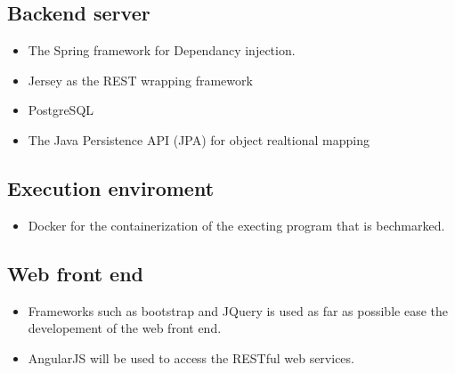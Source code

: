 \subsection{Backend server}
\begin{itemize}
\item The Spring framework for Dependancy injection.
\item Jersey as the REST wrapping framework
\item PostgreSQL
\item The Java Persistence API (JPA) for object realtional mapping
\end{itemize}

\subsection{Execution enviroment}
\begin{itemize}
\item Docker for the containerization of the execting program that is bechmarked.
\end{itemize}

\subsection{Web front end}
\begin{itemize}
\item Frameworks such as bootstrap and JQuery is used as far as possible ease the
developement of the web front end.
\item AngularJS will be used to access the RESTful web services.
\end{itemize}
